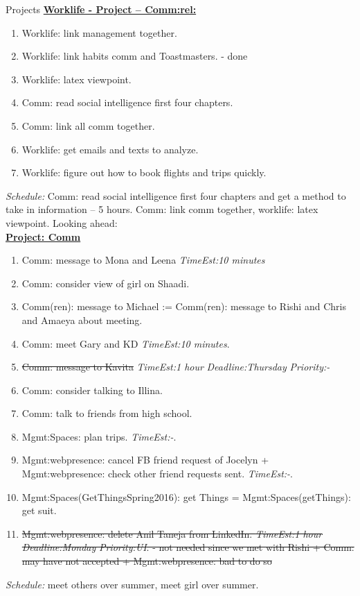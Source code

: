 \documentclass[serif, mathserif, final]{beamer}
\newcommand{\doneTask}[1]{\tiny \item \tiny \sout{#1}}
\newcommand{\te}[1]{\textit{TimeEst:}\textit{#1}}
\newcommand{\dl}[1]{\textit{Deadline:}\textit{#1}}
\newcommand{\pr}[1]{\textit{Priority:}\textit{#1}}
\begin{document}
\begin{frame}
\begin{columns}
\begin{column}{0.5\textwidth}
\begin{block}{Projects}
{\underline{\textbf{Worklife - Project – Comm:rel:}}}
\begin{enumerate} 
  \tiny \item \tiny Worklife: link management together.  
\item \tiny Worklife: link habits comm and Toastmasters. - done
\item \tiny Worklife: latex viewpoint. 
\item \tiny Comm: read social intelligence first four chapters.
\item \tiny Comm: link all comm together.
\item \tiny Worklife: get emails and texts to analyze. 
\item \tiny Worklife: figure out how to book flights and trips quickly. 
\end{enumerate}
\textit{Schedule:} Comm: read social intelligence first four chapters
and get a method to take in information – 5 hours. Comm: link comm together, worklife: latex viewpoint. Looking ahead:  \\
{\underline{\textbf{ Project: Comm}}}


\begin{enumerate}
  \tiny \item \tiny Comm: message to Mona and Leena \te{10 minutes} 
\item \tiny Comm: consider view of girl on Shaadi. 
\item \tiny Comm(ren): message to Michael :=  Comm(ren): message to Rishi and Chris and Amaeya about meeting. 
\item \tiny Comm: meet Gary and KD \te{10 minutes}. 
  \doneTask{Comm: message to Kavita} 
\te{1 hour} \dl{Thursday} \pr{-}
      \item \tiny Comm: consider talking to Illina.
      \item \tiny Comm: talk to friends from high school.
      \item \tiny Mgmt:Spaces: plan trips. \te{-}.
      \item \tiny Mgmt:webpresence: cancel FB friend request of
        Jocelyn + Mgmt:webpresence: check other friend requests
        sent. \te{-}.
      \item \tiny Mgmt:Spaces(GetThingsSpring2016): get Things =
        Mgmt:Spaces(getThings): get suit. 
      \doneTask{Mgmt:webpresence: delete Anil Taneja from
        LinkedIn. \te{1 hour} \dl{Monday} \pr{UI}. - not needed since
        we met with Rishi  + Comm: may have not accepted +
        Mgmt:webpresence: bad to do so}
\end{enumerate}
{\it Schedule:} meet others over summer, meet girl over summer.\\


\end{block}
\end{column}
\end{columns}
\end{frame}
\end{document}
